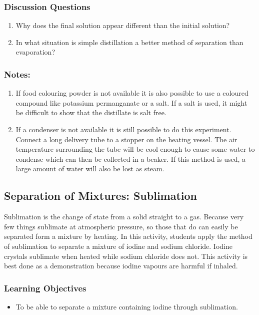 \subsubsection*{Discussion Questions}
\begin{enumerate}
\item{Why does the final solution appear different than the initial solution?}
\item{In what situation is simple distillation a better method of separation than evaporation?}
\end{enumerate}
\subsubsection*{Notes:}
\begin{enumerate}
\item{If food colouring powder is not available it is also possible to use a coloured compound like potassium permanganate or a salt. If a salt is used, it might be difficult to show that the distillate is salt free.}
\item{If a condenser is not available it is still possible to do this experiment. Connect a long delivery tube to a stopper on the heating vessel. The air temperature surrounding the tube will be cool enough to cause some water to condense which can then be collected in a beaker. If this method is used, a large amount of water will also be lost as steam.}
\end{enumerate}

\subsection{Separation of Mixtures: Sublimation}
Sublimation is the change of state from a solid straight to a gas. Because very few things sublimate at atmospheric pressure, so those that do can easily be separated form a mixture by heating. In this activity, students apply the method of sublimation to separate a mixture of iodine and sodium chloride. Iodine crystals sublimate when heated while sodium chloride does not. This activity is best done as a demonstration because iodine vapours are harmful if inhaled.
\subsubsection*{Learning Objectives}
\begin{itemize}
\item{To be able to separate a mixture containing iodine through sublimation.}
\end{itemize}

